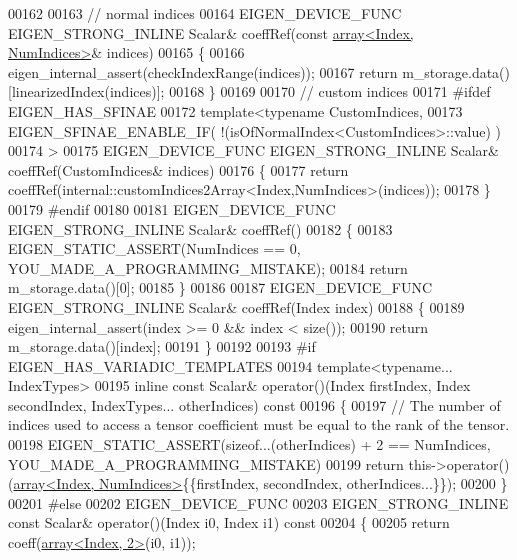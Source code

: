 \begin{DoxyCode}
00162 
00163     \textcolor{comment}{// normal indices}
00164     EIGEN\_DEVICE\_FUNC EIGEN\_STRONG\_INLINE Scalar& coeffRef(\textcolor{keyword}{const} 
      \hyperlink{class_eigen_1_1array}{array<Index, NumIndices>}& indices)
00165     \{
00166       eigen\_internal\_assert(checkIndexRange(indices));
00167       \textcolor{keywordflow}{return} m\_storage.data()[linearizedIndex(indices)];
00168     \}
00169 
00170     \textcolor{comment}{// custom indices}
00171 \textcolor{preprocessor}{#ifdef EIGEN\_HAS\_SFINAE}
00172     \textcolor{keyword}{template}<\textcolor{keyword}{typename} CustomIndices,
00173              EIGEN\_SFINAE\_ENABLE\_IF( !(isOfNormalIndex<CustomIndices>::value) )
00174              >
00175     EIGEN\_DEVICE\_FUNC EIGEN\_STRONG\_INLINE Scalar& coeffRef(CustomIndices& indices)
00176     \{
00177         \textcolor{keywordflow}{return} coeffRef(internal::customIndices2Array<Index,NumIndices>(indices));
00178     \}
00179 \textcolor{preprocessor}{#endif}
00180 
00181     EIGEN\_DEVICE\_FUNC EIGEN\_STRONG\_INLINE Scalar& coeffRef()
00182     \{
00183       EIGEN\_STATIC\_ASSERT(NumIndices == 0, YOU\_MADE\_A\_PROGRAMMING\_MISTAKE);
00184       \textcolor{keywordflow}{return} m\_storage.data()[0];
00185     \}
00186 
00187     EIGEN\_DEVICE\_FUNC EIGEN\_STRONG\_INLINE Scalar& coeffRef(Index index)
00188     \{
00189       eigen\_internal\_assert(index >= 0 && index < size());
00190       \textcolor{keywordflow}{return} m\_storage.data()[index];
00191     \}
00192 
00193 \textcolor{preprocessor}{#if EIGEN\_HAS\_VARIADIC\_TEMPLATES}
00194     \textcolor{keyword}{template}<\textcolor{keyword}{typename}... IndexTypes>
00195     \textcolor{keyword}{inline} \textcolor{keyword}{const} Scalar& operator()(Index firstIndex, Index secondIndex, IndexTypes... otherIndices)\textcolor{keyword}{ const}
00196 \textcolor{keyword}{    }\{
00197       \textcolor{comment}{// The number of indices used to access a tensor coefficient must be equal to the rank of the tensor.}
00198       EIGEN\_STATIC\_ASSERT(\textcolor{keyword}{sizeof}...(otherIndices) + 2 == NumIndices, YOU\_MADE\_A\_PROGRAMMING\_MISTAKE)
00199       \textcolor{keywordflow}{return} this->operator()(\hyperlink{class_eigen_1_1array}{array<Index, NumIndices>}\{\{firstIndex, secondIndex, 
      otherIndices...\}\});
00200     \}
00201 \textcolor{preprocessor}{#else}
00202     EIGEN\_DEVICE\_FUNC
00203     EIGEN\_STRONG\_INLINE \textcolor{keyword}{const} Scalar& operator()(Index i0, Index i1)\textcolor{keyword}{ const}
00204 \textcolor{keyword}{    }\{
00205       \textcolor{keywordflow}{return} coeff(\hyperlink{class_eigen_1_1array}{array<Index, 2>}(i0, i1));

\end{DoxyCode}
